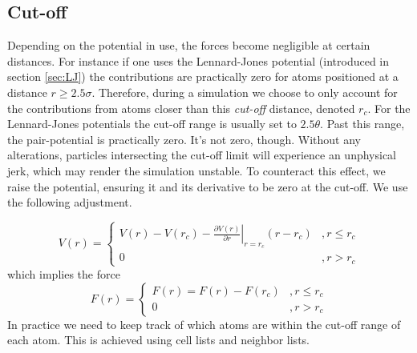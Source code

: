 \documentclass[twoside,english]{uiofysmaster}
\begin{document}
\subsection{Cut-off}
Depending on the potential in use, the forces become negligible at certain distances. 
For instance if one uses the Lennard-Jones potential (introduced in section \ref{sec:LJ}) the contributions are practically zero for atoms positioned at a distance $r\geq2.5\sigma$.
Therefore, during a simulation we choose to only account for the contributions from atoms closer than this \textit{cut-off} distance, denoted $r_c$.  
For the Lennard-Jones potentials the cut-off range is usually set to $2.5\theta$. 
Past this range, the pair-potential is practically zero. 
It's not zero, though. 
Without any alterations, particles intersecting the cut-off limit will experience an unphysical jerk, which may render the simulation unstable.  
To counteract this effect, we raise the potential, ensuring it and its derivative to be zero at the cut-off. 
We use the following adjustment.

\begin{equation}
	V(r) = 
	\begin{cases}
		\left.V(r) - V(r_c) - \frac{\partial V(r)}{\partial r}\right\rvert_{r=r_c} (r-r_c) &, r\leq r_c \\
		0 &, r>r_c 
	\end{cases}
	\label{eq:truncation}
\end{equation}
which implies the force
\begin{equation}
F(r) = 
\begin{cases}
F(r) = F(r) - F(r_c) &, r\leq r_c \\
0 &, r>r_c 
\end{cases}
\end{equation}
In practice we need to keep track of which atoms are within the cut-off range of each atom. 
This is achieved using cell lists and neighbor lists. 
\end{document}
